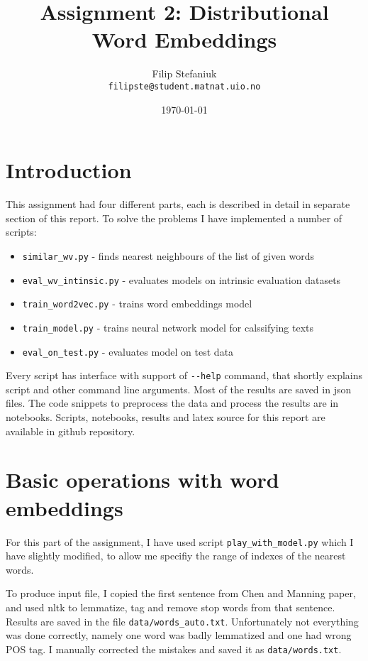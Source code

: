 \documentclass{article}
\title{Assignment 2: Distributional\\ Word Embeddings} %
\author{Filip Stefaniuk\\ \texttt{filipste@student.matnat.uio.no}} %
\date{\today} %
\begin{document}
\maketitle %

\section*{Introduction}
This assignment had four different parts, each is described in detail in separate section of this report.
To solve the problems I have implemented a number of scripts:
\begin{itemize}
	\item \lstinline{similar_wv.py} - finds nearest neighbours of the list of given words
	\item \lstinline{eval_wv_intinsic.py} - evaluates models on intrinsic evaluation datasets
	\item \lstinline{train_word2vec.py} - trains word embeddings model
	\item \lstinline{train_model.py} - trains neural network model for calssifying texts
	\item \lstinline{eval_on_test.py} - evaluates model on test data
\end{itemize}
Every script has interface with support of \lstinline{--help} command, that shortly explains script and
other command line arguments. Most of the results are saved in json files. The code snippets to
preprocess the data and process the results are in notebooks. Scripts, notebooks, results and
latex source for this report are available in github repository.
\section{Basic operations with word embeddings}

For this part of the assignment, I have used script \lstinline{play_with_model.py} which I
have slightly modified, to allow me specifiy the range of indexes of the nearest words.

To produce input file, I copied the first sentence from Chen and Manning paper, and used
nltk to lemmatize, tag and remove stop words from that sentence. Results are saved in the file
\lstinline{data/words_auto.txt}. Unfortunately not everything was done correctly, namely one
word was badly lemmatized and one had wrong POS tag. I manually
corrected the mistakes and saved it as \lstinline{data/words.txt}.
\end{document}
